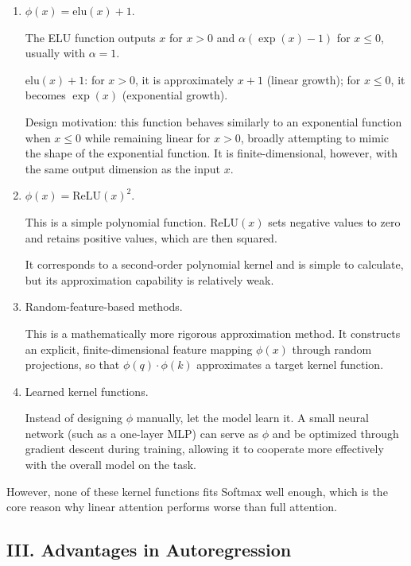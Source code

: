 \begin{enumerate}
\def\labelenumi{\arabic{enumi}.}
\item
  \(\phi(x)=\mathrm{elu}(x)+1\).

  The ELU function outputs \(x\) for \(x>0\) and \(\alpha(\exp(x)-1)\) for \(x\le 0\), usually with \(\alpha=1\).

  \(\mathrm{elu}(x)+1\): for \(x>0\), it is approximately \(x+1\) (linear growth); for \(x\le 0\), it becomes \(\exp(x)\) (exponential growth).

  Design motivation: this function behaves similarly to an exponential function when \(x\le 0\) while remaining linear for \(x>0\), broadly attempting to mimic the shape of the exponential function. It is finite-dimensional, however, with the same output dimension as the input \(x\).
\item
  \(\phi(x)=\mathrm{ReLU}(x)^2\).

  This is a simple polynomial function. \(\mathrm{ReLU}(x)\) sets negative values to zero and retains positive values, which are then squared.

  It corresponds to a second-order polynomial kernel and is simple to calculate, but its approximation capability is relatively weak.
\item
  Random-feature-based methods.

  This is a mathematically more rigorous approximation method. It constructs an explicit, finite-dimensional feature mapping \(\phi(x)\) through random projections, so that \(\phi(q)\cdot\phi(k)\) approximates a target kernel function.
\item
  Learned kernel functions.

  Instead of designing \(\phi\) manually, let the model learn it. A small neural network (such as a one-layer MLP) can serve as \(\phi\) and be optimized through gradient descent during training, allowing it to cooperate more effectively with the overall model on the task.
\end{enumerate}

However, none of these kernel functions fits Softmax well enough, which is the core reason why linear attention performs worse than full attention.

\hypertarget{iii.-advantages-in-autoregression}{%
\subsection{III. Advantages in Autoregression}\label{iii.-advantages-in-autoregression}}

